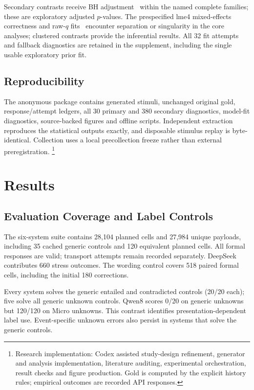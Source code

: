 \documentclass[sigconf,anonymous,review]{acmart}
\begin{document}
Secondary contrasts receive BH adjustment~\cite{bh1995} within the named complete families; these are exploratory adjusted $p$-values. The prespecified lme4 mixed-effects correctness and raw-$q$ fits~\cite{bates2015} encounter separation or singularity in the core analyses; clustered contrasts provide the inferential results. All 32 fit attempts and fallback diagnostics are retained in the supplement, including the single usable exploratory prior fit.

\subsection{Reproducibility}
The anonymous package contains generated stimuli, unchanged original gold, response/attempt ledgers, all 30 primary and 380 secondary diagnostics, model-fit diagnostics, source-backed figures and offline scripts. Independent extraction reproduces the statistical outputs exactly, and disposable stimulus replay is byte-identical. Collection uses a local precollection freeze rather than external preregistration. \footnote{Research implementation: Codex assisted study-design refinement, generator and analysis implementation, literature auditing, experimental orchestration, result checks and figure production. Gold is computed by the explicit history rules; empirical outcomes are recorded API responses.}

\section{Results}
\subsection{Evaluation Coverage and Label Controls}
The six-system suite contains 28,104 planned cells and 27,984 unique payloads, including 35 cached generic controls and 120 equivalent planned cells. All formal responses are valid; transport attempts remain recorded separately. DeepSeek contributes 660 stress outcomes. The wording control covers 518 paired formal cells, including the initial 180 corrections.

Every system solves the generic entailed and contradicted controls (20/20 each); five solve all generic unknown controls. Qwen8 scores 0/20 on generic unknowns but 120/120 on Micro unknowns. This contrast identifies presentation-dependent label use. Event-specific unknown errors also persist in systems that solve the generic controls.
\end{document}

